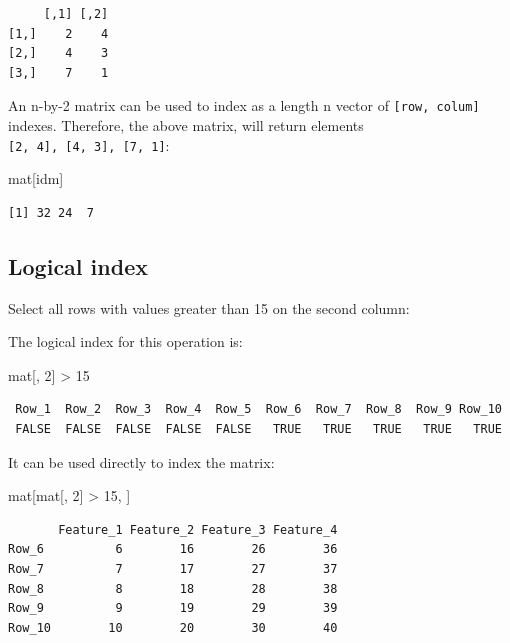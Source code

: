 \documentclass[
]{book}
\newenvironment{Shaded}{\begin{snugshade}}{\end{snugshade}}
\newcommand{\DecValTok}[1]{\textcolor[rgb]{0.00,0.00,0.81}{#1}}
\newcommand{\NormalTok}[1]{#1}
\newcommand{\SpecialCharTok}[1]{\textcolor[rgb]{0.00,0.00,0.00}{#1}}
\begin{document}
\begin{verbatim}
     [,1] [,2]
[1,]    2    4
[2,]    4    3
[3,]    7    1
\end{verbatim}

An n-by-2 matrix can be used to index as a length n vector of \texttt{{[}row,\ colum{]}} indexes. Therefore, the above matrix, will return elements \texttt{{[}2,\ 4{]},\ {[}4,\ 3{]},\ {[}7,\ 1{]}}:

\begin{Shaded}
\begin{Highlighting}[]
\NormalTok{mat[idm]}
\end{Highlighting}
\end{Shaded}

\begin{verbatim}
[1] 32 24  7
\end{verbatim}

\hypertarget{matidl}{%
\subsection{Logical index}\label{matidl}}

Select all rows with values greater than 15 on the second column:

The logical index for this operation is:

\begin{Shaded}
\begin{Highlighting}[]
\NormalTok{mat[, }\DecValTok{2}\NormalTok{] }\SpecialCharTok{\textgreater{}} \DecValTok{15}
\end{Highlighting}
\end{Shaded}

\begin{verbatim}
 Row_1  Row_2  Row_3  Row_4  Row_5  Row_6  Row_7  Row_8  Row_9 Row_10 
 FALSE  FALSE  FALSE  FALSE  FALSE   TRUE   TRUE   TRUE   TRUE   TRUE 
\end{verbatim}

It can be used directly to index the matrix:

\begin{Shaded}
\begin{Highlighting}[]
\NormalTok{mat[mat[, }\DecValTok{2}\NormalTok{] }\SpecialCharTok{\textgreater{}} \DecValTok{15}\NormalTok{, ]}
\end{Highlighting}
\end{Shaded}

\begin{verbatim}
       Feature_1 Feature_2 Feature_3 Feature_4
Row_6          6        16        26        36
Row_7          7        17        27        37
Row_8          8        18        28        38
Row_9          9        19        29        39
Row_10        10        20        30        40
\end{verbatim}
\end{document}
